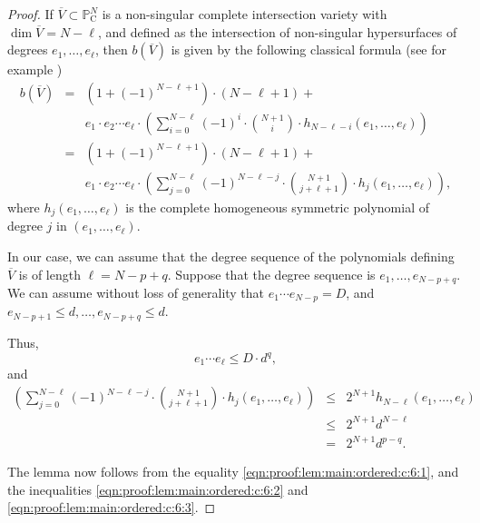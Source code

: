 \documentclass[10pt]{amsart}
\theoremstyle{definition}
\theoremstyle{remark}
\numberwithin{equation}{section}
\newcommand {\C}     {\mathrm{C}}
\newcommand {\PP}     {\mathbb{P}} %
\begin{document}
\begin{proof}
If $\overline{V} \subset \PP^N_\C$ is a non-singular complete intersection variety
with $\dim \overline{V} = N - \ell$, and defined as the intersection of non-singular hypersurfaces of degrees $e_1,\ldots,e_{\ell}$, then
$b(\overline{V})$ is given by the following classical formula
(see for example \cite[\S 5.7.2-3]{Eisenbud-Harris})
\begin{eqnarray}
\nonumber
b(\overline{V}) &=& (1 + (-1)^{N-\ell+1})\cdot (N-\ell+1) + \\
\nonumber
&& e_1 \cdot e_2\cdots e_\ell\cdot \left(\sum_{i=0}^{N-\ell}(-1)^{i}\cdot\binom{N+1}{i} \cdot h_{N-\ell -i}(e_1,\ldots,e_\ell)  \right) \\
\label{eqn:proof:lem:main:ordered:c:6:1}
&=& (1 + (-1)^{N-\ell+1})\cdot (N-\ell+1) + \\
\nonumber
&& e_1 \cdot e_2\cdots e_\ell\cdot \left(\sum_{j=0}^{N-\ell}(-1)^{N-\ell -j}\cdot\binom{N+1}{j+\ell+1} \cdot h_{j}(e_1,\ldots,e_\ell)  \right),
\end{eqnarray}
where
$h_j(e_1,\ldots,e_\ell)$
is the complete homogeneous symmetric polynomial of degree $j$ in $(e_1,\ldots, e_\ell)$.

In our case, we can assume that the degree sequence of the polynomials defining $\overline{V}$ is of length $\ell= N-p+q$. Suppose that the degree sequence is
$e_1,\ldots,e_{N-p+q}$. We can assume without loss of generality that
$e_1 \cdots e_{N-p} =D$, and $e_{N-p+1} \leq  d,\ldots,e_{N-p+q} \leq d$.

Thus, 
\begin{equation}
\label{eqn:proof:lem:main:ordered:c:6:2}
e_1 \cdots e_\ell \leq  D \cdot d^q,
\end{equation}
and
\begin{eqnarray}
\nonumber
 \left(\sum_{j=0}^{N-\ell}(-1)^{N-\ell -j}\cdot\binom{N+1}{j+\ell+1} \cdot h_{j}(e_1,\ldots,e_\ell)  \right) 
&\leq& 
2^{N+1} h_{N-\ell}(e_1,\ldots,e_\ell) \\
\label{eqn:proof:lem:main:ordered:c:6:3}
&\leq &
2^{N+1} d^{N-\ell} \\
\nonumber
&=& 2^{N+1} d^{p-q}. 
\end{eqnarray}

The lemma now follows from the equality
\eqref{eqn:proof:lem:main:ordered:c:6:1}, and 
the inequalities 
\eqref{eqn:proof:lem:main:ordered:c:6:2}
and
\eqref{eqn:proof:lem:main:ordered:c:6:3}.
\end{proof}
\end{document}

